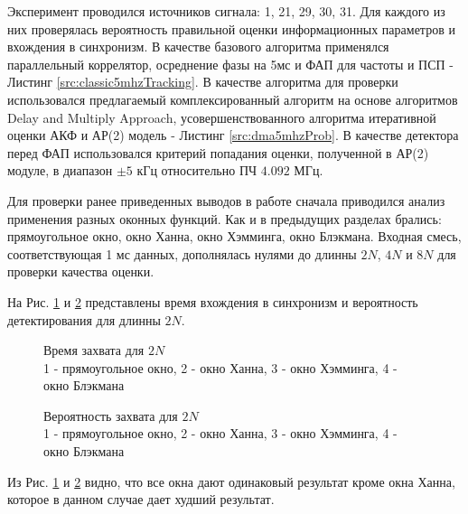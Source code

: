 Эксперимент проводился источников сигнала: 1, 21, 29, 30, 31. Для каждого из них проверялась вероятность правильной оценки информационных параметров и вхождения в синхронизм.
В качестве базового алгоритма применялся параллельный коррелятор, осреднение фазы на 5мс и ФАП для частоты и ПСП - Листинг \ref{src:classic5mhzTracking}. В качестве алгоритма для проверки
использовался предлагаемый комплексированный алгоритм на основе алгоритмов Delay and Multiply Approach, усовершенствованного алгоритма итеративной оценки АКФ и
АР(2) модель - Листинг \ref{src:dma5mhzProb}. В качестве детектора перед ФАП использовался критерий попадания оценки, полученной в АР(2) модуле, в диапазон ${\pm 5}$ кГц относительно
ПЧ ${4.092}$ МГц. 

Для проверки ранее приведенных выводов в работе сначала приводился анализ применения разных оконных функций. Как и в предыдущих разделах брались: прямоугольное окно,
окно Ханна, окно Хэмминга, окно Блэкмана. Входная смесь, соответствующая 1 мс данных, дополнялась нулями до длинны ${2N}$, ${4N}$ и ${8N}$ для проверки качества
оценки.

На Рис. \ref{pic:dma5mhz_2fft_lockTime} и \ref{pic:dma5mhz_2fft_probDetection} представлены время вхождения в синхронизм и вероятность детектирования для длинны ${2N}$.
\begin{figure}[h]
\center{}
	\caption{Время захвата для ${2N}$ \\ 1 - прямоугольное окно, 2 - окно Ханна, 3 - окно Хэмминга, 4 - окно Блэкмана}
	\label{pic:dma5mhz_2fft_lockTime}
\end{figure}
\begin{figure}[h]
\center{}
	\caption{Вероятность захвата для ${2N}$ \\ 1 - прямоугольное окно, 2 - окно Ханна, 3 - окно Хэмминга, 4 - окно Блэкмана}
	\label{pic:dma5mhz_2fft_probDetection}
\end{figure}
Из Рис. \ref{pic:dma5mhz_2fft_lockTime} и \ref{pic:dma5mhz_2fft_probDetection} видно, что все окна дают одинаковый результат кроме окна Ханна, которое в данном случае дает худший результат.

